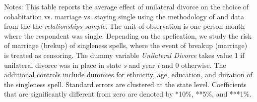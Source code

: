 \begin{table}[H]\centering                                                                   \caption{The average effect of unilateral divorce on the choice of cohabitation vs. marriage vs. staying single for single individuals}                                   \label{tab:tabrel}                                 
\begin{minipage}{\textwidth}
\scriptsize\smallskip
Notes: This table reports the average effect of unilateral divorce on the choice of cohabitation vs. marriage vs. staying single using the methodology of \cite{borusyak2021} and data from the the \textit{relationships sample}. The unit of observation is one person-month where the respondent was single. Depending on the spefication, we study the risk of marriage (brekup) of singleness spells, where the event of breakup (marriage) is treated as censoring. The dummy variable \textit{Unilateral Divorce} takes value 1 if unilateral divorce was in place in state \textit{s} and year \textit{t} and 0 otherwise. The additional controls include dummies for ethnicity, age, education, and duration of the singleness spell. Standard errors are clustered at the state level. Coefficients that are significantly different from zero are denoted by *10\%, **5\%, and ***1\%.
\\
\end{minipage}
\end{table}
